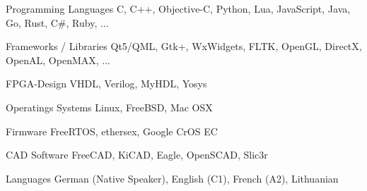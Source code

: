 
\begin{cvskills}

  \cvskill
    {Programming Languages} %
    {C, C++, Objective-C, Python, Lua, JavaScript, Java, Go, Rust, C\#, Ruby, ...} %
    
  \cvskill
    {Frameworks / Libraries} %
    {Qt5/QML, Gtk+, WxWidgets, FLTK, OpenGL, DirectX, OpenAL, OpenMAX, ...} %

  \cvskill
    {FPGA-Design} %
    {VHDL, Verilog, MyHDL, Yosys} %
    
  \cvskill
    {Operatings Systems} %
    {Linux, FreeBSD, Mac OSX} %

  \cvskill
    {Firmware}
    {FreeRTOS, ethersex, Google CrOS EC}
    
  \cvskill
    {CAD Software} %
    {FreeCAD, KiCAD, Eagle, OpenSCAD, Slic3r} %

  \cvskill
    {Languages} %
    {German (Native Speaker), English (C1), French (A2), Lithuanian} %

\end{cvskills}
